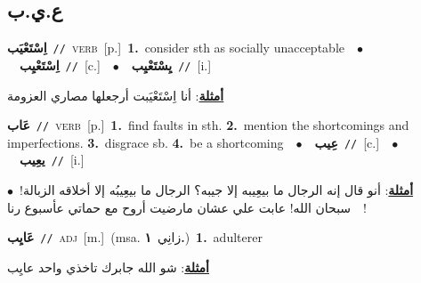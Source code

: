 \documentclass[10pt,a4paper,twoside]{article} %
\begin{document}
\begin{multicols}{2}
\vspace{-3mm}
\subsection*{\color{blue}\foreignlanguage{arabic}{ع.ي.ب}\color{blue}{}} 

{\setlength\topsep{0pt}\textbf{\foreignlanguage{arabic}{اِسْتَعْيَب}}\ {\color{gray}\texttt{//}\color{black}}\ \textsc{verb}\ [p.]\ \textbf{1.}~consider sth as socially unacceptable\ \ $\bullet$\ \ \setlength\topsep{0pt}\textbf{\foreignlanguage{arabic}{اِسْتَعْيِب}}\ {\color{gray}\texttt{//}\color{black}}\ [c.]\ \ $\bullet$\ \ \setlength\topsep{0pt}\textbf{\foreignlanguage{arabic}{يِسْتَعْيِب}}\ {\color{gray}\texttt{//}\color{black}}\ [i.]\  \begin{flushright}\color{gray}\foreignlanguage{arabic}{\textbf{\underline{\foreignlanguage{arabic}{أمثلة}}}: أنا اِسْتَعْيَبت أرجعلها مصاري العزومة}\end{flushright}\color{black}} \vspace{2mm}

{\setlength\topsep{0pt}\textbf{\foreignlanguage{arabic}{عَاب}}\ {\color{gray}\texttt{//}\color{black}}\ \textsc{verb}\ [p.]\ \textbf{1.}~find faults in sth.  \textbf{2.}~mention the shortcomings and imperfections.  \textbf{3.}~disgrace sb.  \textbf{4.}~be a shortcoming\ \ $\bullet$\ \ \setlength\topsep{0pt}\textbf{\foreignlanguage{arabic}{عِيب}}\ {\color{gray}\texttt{//}\color{black}}\ [c.]\ \ $\bullet$\ \ \setlength\topsep{0pt}\textbf{\foreignlanguage{arabic}{يعِيب}}\ {\color{gray}\texttt{//}\color{black}}\ [i.]\  \begin{flushright}\color{gray}\foreignlanguage{arabic}{\textbf{\underline{\foreignlanguage{arabic}{أمثلة}}}: أنو قال إنه الرجال ما بيعِيبه إلا جيبه؟ الرجال ما بيعِيبُه إلا أخلاقه الزبالة!\ $\bullet$\ \  سبحان الله! عابت علي عشان مارضيت أروح مع حماتي عأسبوع رنا!}\end{flushright}\color{black}} \vspace{2mm}

{\setlength\topsep{0pt}\textbf{\foreignlanguage{arabic}{عَايِب}}\ {\color{gray}\texttt{//}\color{black}}\ \textsc{adj}\ [m.]\ \color{gray}(msa. \foreignlanguage{arabic}{زانِي}~\foreignlanguage{arabic}{\textbf{١.}})\color{black}\ \textbf{1.}~adulterer\  \begin{flushright}\color{gray}\foreignlanguage{arabic}{\textbf{\underline{\foreignlanguage{arabic}{أمثلة}}}: شو الله جابرك تاخذي واحد عايِب}\end{flushright}\color{black}} \vspace{2mm}


\end{multicols}
\end{document}
